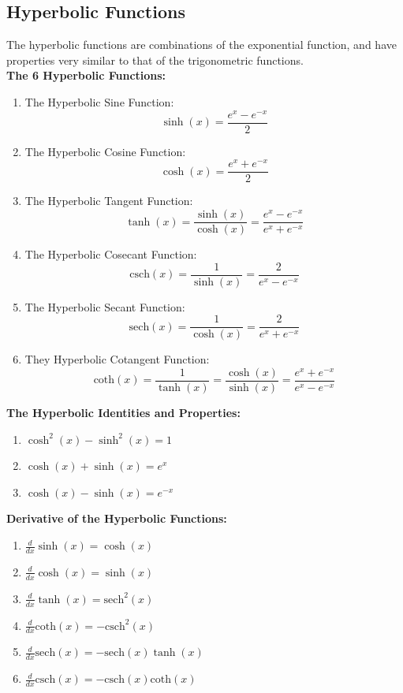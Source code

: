 \documentclass[14pt]{article}
\begin{document}
    \subsection{Hyperbolic Functions}
    The hyperbolic functions are combinations of the exponential
    function, and have properties very similar to that of the
    trigonometric functions.\\
    \textbf{The 6 Hyperbolic Functions:}\\
    \begin{enumerate}
        \item The Hyperbolic Sine Function:
        $$\sinh(x)=\frac{e^x-e^{-x}}{2}$$
        \item The Hyperbolic Cosine Function:
        $$\cosh(x)=\frac{e^x+e^{-x}}{2}$$
        \item The Hyperbolic Tangent Function:
        $$\tanh(x)=\frac{\sinh(x)}{\cosh(x)}=\frac{e^x-e^{-x}}{e^x+e^{-x}}$$
        \item The Hyperbolic Cosecant Function:
        $$\mathrm{csch}(x)=\frac{1}{\sinh(x)}=\frac{2}{e^x-e^{-x}}$$
        \item The Hyperbolic Secant Function:
        $$\mathrm{sech}(x)=\frac{1}{\cosh(x)}=\frac{2}{e^x+e^{-x}}$$
        \item They Hyperbolic Cotangent Function:
        $$\mathrm{coth}(x)=\frac{1}{\tanh(x)}=\frac{\cosh(x)}{\sinh(x)}=\frac{e^x+e^{-x}}{e^x-e^{-x}}$$
    \end{enumerate}
    \textbf{The Hyperbolic Identities and Properties:}
    \begin{enumerate}
        \item $\cosh^2(x)-\sinh^2(x)=1$
        \item $\cosh(x)+\sinh(x)=e^x$
        \item $\cosh(x)-\sinh(x)=e^{-x}$
    \end{enumerate}
    \textbf{Derivative of the Hyperbolic Functions:}\\
    \begin{enumerate}
        \item $\frac{d}{dx} \sinh(x)=\cosh(x)$
        \item $\frac{d}{dx} \cosh(x)=\sinh(x)$
        \item $\frac{d}{dx} \tanh(x)=\mathrm{sech}^2(x)$
        \item $\frac{d}{dx} \mathrm{coth}(x)=-\mathrm{csch}^2(x)$
        \item $\frac{d}{dx} \mathrm{sech}(x)=-\mathrm{sech}(x)\tanh(x)$
        \item $\frac{d}{dx}
        \mathrm{csch}(x)=-\mathrm{csch}(x)\mathrm{coth}(x)$
    \end{enumerate}
\end{document}
